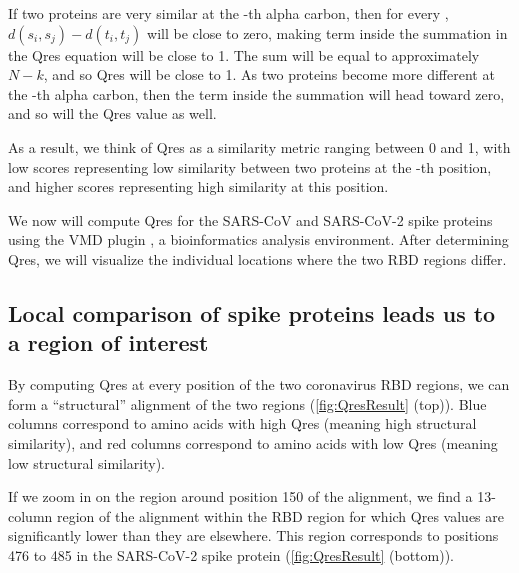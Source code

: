 If two proteins are very similar at the -th alpha carbon, then for every , $d(s_{i}, s_{j}) - d(t_{i}, t_{j})$ will be close to zero, making term inside the summation in the Qres equation will be close to 1. The sum will be equal to approximately $N - k$, and so Qres will be close to 1. As two proteins become more different at the -th alpha carbon, then the term inside the summation will head toward zero, and so will the Qres value as well.

As a result, we think of Qres as a similarity metric ranging between 0 and 1, with low scores representing low similarity between two proteins at the -th position, and higher scores representing high similarity at this position.

We now will compute Qres for the SARS-CoV and SARS-CoV-2 spike proteins using the VMD plugin \href{https://bit.ly/3LwTYmp}{}, a bioinformatics analysis environment. After determining Qres, we will visualize the individual locations where the two RBD regions differ. 

\FloatBarrier
{}
\subsection{Local comparison of spike proteins leads us to a region of interest}

By computing Qres at every position of the two coronavirus RBD regions, we can form a ``structural'' alignment of the two regions (\autoref{fig:QresResult} (top)). Blue columns correspond to amino acids with high Qres (meaning high structural similarity), and red columns correspond to amino acids with low Qres (meaning low structural similarity).

If we zoom in on the region around position 150 of the alignment, we find a 13-column region of the alignment within the RBD region for which Qres values are significantly lower than they are elsewhere. This region corresponds to positions 476 to 485 in the SARS-CoV-2 spike protein (\autoref{fig:QresResult} (bottom)).\\

